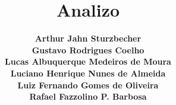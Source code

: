 
\title[Analizo]
{\textbf{\Large{Analizo}}
}

\author[Arthur, Gustavo, Lucas, Luciano, Luiz, Rafael]%
{\textbf{\small{
Arthur Jahn Sturzbecher\\
Gustavo Rodrigues Coelho\\
Lucas Albuquerque Medeiros de Moura\\
Luciano Henrique Nunes de Almeida\\
Luiz Fernando Gomes de Oliveira\\
Rafael Fazzolino P. Barbosa\\
}}}
\date{} %
